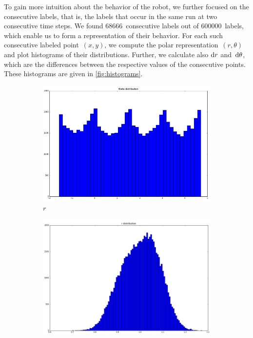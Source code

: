 \documentclass[twoside]{article}
\begin{document}
To gain more intuition about the behavior of the robot, we further focused on the consecutive labels, that is, the labels that occur in the same run at two consecutive time steps.
We found $\num{68666}$~consecutive labels out of $\num{600000}$~labels, which enable us to form a representation of their behavior.
For each such consecutive labeled point~${(x, y)}$, we compute the polar representation~${(r, \theta)}$ and plot histograms of their distributions.
Further, we calculate also ${\mathop{}\!\mathrm{d} r}$ and~${\mathop{}\!\mathrm{d} \theta}$, which are the differences between the respective values of the consecutive points.
These histograms are given in \cref{fig:histograms}.
\begin{figure}[h]
  \centering
  \begin{subfigure}[h]{0.4\textwidth}
    \includegraphics[width=\textwidth]{images/AK3}
    \caption{$r$}\label{fig:hist-r}
  \end{subfigure}
  \begin{subfigure}[h]{0.4\textwidth}
    \includegraphics[width=\textwidth]{images/AK4}

\end{subfigure}
\end{figure}
\end{document}
